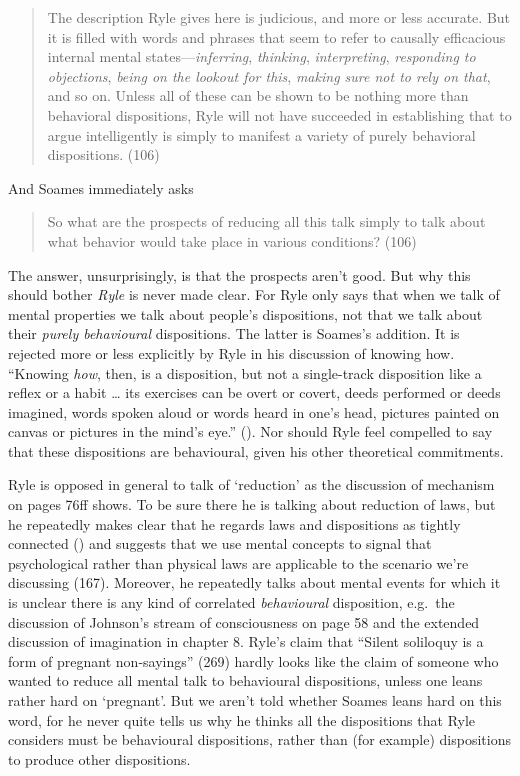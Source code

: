 \documentclass[
  10pt,
  letterpaper,
  DIV=11,
  numbers=noendperiod,
  twoside]{scrartcl}
\begin{document}
\begin{quote}
The description Ryle gives here is judicious, and more or less accurate.
But it is filled with words and phrases that seem to refer to causally
efficacious internal mental states---\emph{inferring}, \emph{thinking},
\emph{interpreting}, \emph{responding to objections}, \emph{being on the
lookout for this}, \emph{making sure not to rely on that}, and so on.
Unless all of these can be shown to be nothing more than behavioral
dispositions, Ryle will not have succeeded in establishing that to argue
intelligently is simply to manifest a variety of purely behavioral
dispositions. (106)
\end{quote}

And Soames immediately asks

\begin{quote}
So what are the prospects of reducing all this talk simply to talk about
what behavior would take place in various conditions? (106)
\end{quote}

The answer, unsurprisingly, is that the prospects aren't good. But why
this should bother \emph{Ryle} is never made clear. For Ryle only says
that when we talk of mental properties we talk about people's
dispositions, not that we talk about their \emph{purely behavioural}
dispositions. The latter is Soames's addition. It is rejected more or
less explicitly by Ryle in his discussion of knowing how. ``Knowing
\emph{how}, then, is a disposition, but not a single-track disposition
like a reflex or a habit \ldots{} its exercises can be overt or covert,
deeds performed or deeds imagined, words spoken aloud or words heard in
one's head, pictures painted on canvas or pictures in the mind's eye.''
(). Nor should Ryle feel compelled
to say that these dispositions are behavioural, given his other
theoretical commitments.

Ryle is opposed in general to talk of `reduction' as the discussion of
mechanism on pages 76ff shows. To be sure there he is talking about
reduction of laws, but he repeatedly makes clear that he regards laws
and dispositions as tightly connected () and suggests that we use mental concepts to signal that
psychological rather than physical laws are applicable to the scenario
we're discussing (167). Moreover, he repeatedly talks about mental
events for which it is unclear there is any kind of correlated
\emph{behavioural} disposition, e.g.~the discussion of Johnson's stream
of consciousness on page 58 and the extended discussion of imagination
in chapter 8. Ryle's claim that ``Silent soliloquy is a form of pregnant
non-sayings'' (269) hardly looks like the claim of someone who wanted to
reduce all mental talk to behavioural dispositions, unless one leans
rather hard on `pregnant'. But we aren't told whether Soames leans hard
on this word, for he never quite tells us why he thinks all the
dispositions that Ryle considers must be behavioural dispositions,
rather than (for example) dispositions to produce other dispositions.
\end{document}
